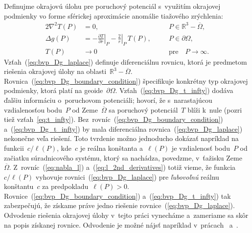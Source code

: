 \documentclass[a4paper, 12pt]{book}
\begin{document}
Definujme okrajovú úlohu pre poruchový potenciál s~využitím okrajovej podmienky 
vo forme sférickej aproximácie anomálie tiažového zrýchlenia:
%
\begin{alignat}{2}
\nabla^2 T(P) &= 0{,} &&P \in \mathbb{R}^3 
- \overline\Omega{,}\label{eq:bvp_Dg_laplace}\\
\Delta g(P) &= -\left.\frac{\partial T}{\partial r}\right|_P 
- \left.\frac{2}{r}\right|_P \, T(P){,} \quad &&P \in 
\partial\Omega{,}\label{eq:bvp_Dg_boundary_condition}\\
T(P) &\rightarrow 0 &&\textrm{pre} \quad P \rightarrow 
\infty{.}\label{eq:bvp_Dg_t_infty}
\end{alignat}
%
Vzťah~(\ref{eq:bvp_Dg_laplace}) definuje diferenciálnu rovnicu, ktorá je 
predmetom riešenia okrajovej úlohy na oblasti~$\mathbb{R}^3 - \overline\Omega$.  
Rovnica~(\ref{eq:bvp_Dg_boundary_condition}) špecifikuje konkrétny typ 
okrajovej podmienky, ktorá platí na geoide~$\partial\Omega$.  
Vzťah~(\ref{eq:bvp_Dg_t_infty}) dodáva ďalšiu informáciu o~poruchovom 
potenciáli; hovorí, že s~narastajúcou vzdialenosťou bodu~$P$ od 
Zeme~$\overline\Omega$ sa poruchový potenciál~$T$ blíži k~nule (pozri tiež 
vzťah~\ref{eq:t_infty}).  Bez~rovníc~(\ref{eq:bvp_Dg_boundary_condition}) 
a~(\ref{eq:bvp_Dg_t_infty}) by mala diferenciálna 
rovnica~(\ref{eq:bvp_Dg_laplace}) nekonečne veľa riešení.  Toto tvrdenie možno 
jednoducho dokázať napríklad na funkcii~$c \slash \ell(P)$, kde~$c$ je reálna 
konštanta a~$\ell(P)$ je vzdialenosť bodu~$P$ od začiatku súradnicového 
systému, ktorý sa nachádza, povedzme, v~ťažisku Zeme~$\overline\Omega$.  
Z~rovníc~(\ref{eq:nabla_l}) a~(\ref{eq:l_2nd_derivatives}) totiž vieme, že 
funkcia~$c \slash \ell(P)$ vyhovuje rovnici~(\ref{eq:bvp_Dg_laplace}) pre 
\emph{ľubovoľnú} reálnu konštantu~$c$ za predpokladu~$\ell(P) > 0$.  
Rovnice~(\ref{eq:bvp_Dg_boundary_condition}) a~(\ref{eq:bvp_Dg_t_infty}) tak 
zabezpečujú, že získame práve jedno riešenie rovnice~(\ref{eq:bvp_Dg_laplace}).  
Odvodenie riešenia okrajovej úlohy v~tejto práci vynecháme a~zameriame sa skôr 
na popis získanej rovnice.  Odvodenie je možné nájsť napríklad 
v~prácach~\textcite{MoritzPhysicalGeodesy} a~\textcite{Janak2006}.
\end{document}
